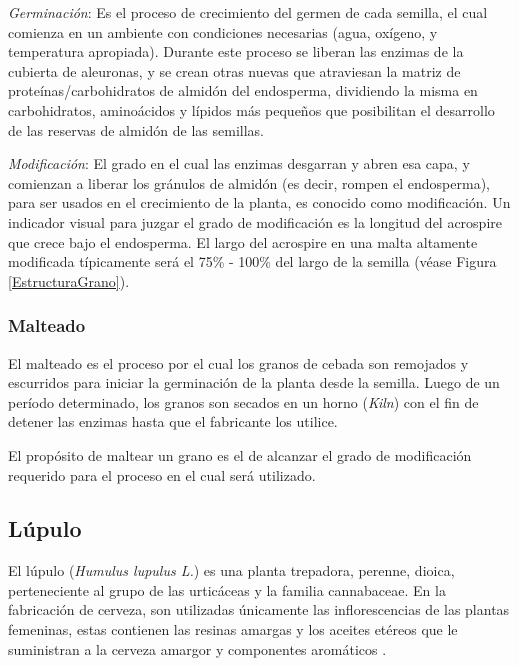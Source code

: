     	        \par \textit{Germinación}: 
    	        Es el proceso de crecimiento del germen de cada semilla, el cual comienza en un ambiente con condiciones necesarias (agua, oxígeno, y temperatura apropiada). Durante este proceso se liberan las enzimas de la cubierta de aleuronas, y se crean otras nuevas que atraviesan la matriz de proteínas/carbohidratos de almidón del endosperma, dividiendo la misma en carbohidratos, aminoácidos y lípidos más pequeños que posibilitan el desarrollo de las reservas de almidón de las semillas.
    	
    	        \par \textit{Modificación}:
    	        El grado en el cual las enzimas desgarran y abren esa capa, y comienzan a liberar los gránulos de almidón (es decir, rompen el endosperma), para ser usados en el crecimiento de la planta, es conocido como modificación. Un indicador visual para juzgar el grado de modificación es la longitud del acrospire que crece bajo el endosperma. El largo del acrospire en una malta altamente modificada típicamente será el 75\% - 100\% del largo de la semilla (véase Figura \ref{EstructuraGrano}). 
    	    \subsubsection{Malteado}
    	        \par El malteado es el proceso por el cual los granos de cebada son remojados y escurridos para iniciar la germinación de la planta desde la semilla. Luego de un período determinado, los granos son secados en un horno (\textit{Kiln}) con el fin de detener las enzimas hasta que el fabricante los utilice.
    	        
    	        \par El propósito de maltear un grano es el de alcanzar el grado de modificación requerido para el proceso en el cual será utilizado.
    	   
        \subsection{Lúpulo}
            \par El lúpulo (\textit{Humulus lupulus  L.}) es una planta trepadora, perenne, dioica, perteneciente al grupo de las urticáceas y la familia cannabaceae. En la fabricación de cerveza, son utilizadas únicamente las inflorescencias de las plantas femeninas, estas contienen las resinas amargas y los aceites etéreos que le suministran a la cerveza amargor y componentes aromáticos \cite{Kunze}.
            
